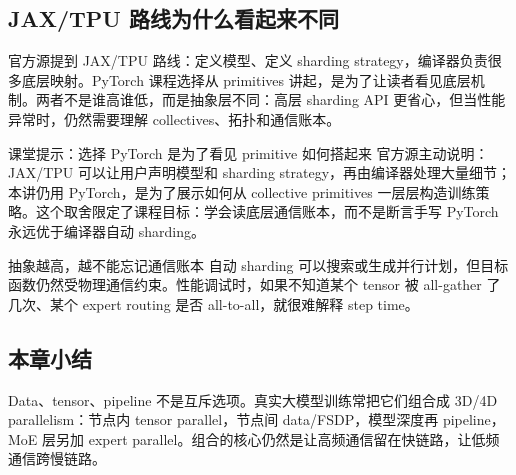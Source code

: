\subsection{JAX/TPU 路线为什么看起来不同}

官方源提到 JAX/TPU 路线：定义模型、定义 sharding strategy，编译器负责很多底层映射。PyTorch 课程选择从 primitives 讲起，是为了让读者看见底层机制。两者不是谁高谁低，而是抽象层不同：高层 sharding API 更省心，但当性能异常时，仍然需要理解 collectives、拓扑和通信账本。

\begin{knowledgebox}{课堂提示：选择 PyTorch 是为了看见 primitive 如何搭起来}
官方源主动说明：JAX/TPU 可以让用户声明模型和 sharding strategy，再由编译器处理大量细节；本讲仍用 PyTorch，是为了展示如何从 collective primitives 一层层构造训练策略。这个取舍限定了课程目标：学会读底层通信账本，而不是断言手写 PyTorch 永远优于编译器自动 sharding。
\end{knowledgebox}

\begin{warningbox}{抽象越高，越不能忘记通信账本}
自动 sharding 可以搜索或生成并行计划，但目标函数仍然受物理通信约束。性能调试时，如果不知道某个 tensor 被 all-gather 了几次、某个 expert routing 是否 all-to-all，就很难解释 step time。
\end{warningbox}

\subsection{本章小结}

Data、tensor、pipeline 不是互斥选项。真实大模型训练常把它们组合成 3D/4D parallelism：节点内 tensor parallel，节点间 data/FSDP，模型深度再 pipeline，MoE 层另加 expert parallel。组合的核心仍然是让高频通信留在快链路，让低频通信跨慢链路。

